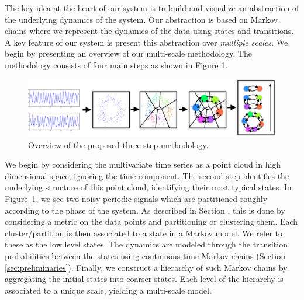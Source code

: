 The key idea at the heart of our system is to build and visualize an abstraction of the underlying 
dynamics of the system. Our abstraction is based on Markov chains where we represent the dynamics of the data using states and transitions. A key feature of our system is  present this abstraction over \emph{multiple scales}. 
%
%
We begin by presenting an overview
of our multi-scale methodology. The methodology consists of four main steps as shown in Figure \ref{fig:methodology}.
\begin{figure}[h!]
	\centering
	\includegraphics[width=\textwidth]{overall1-crop}
	\caption{Overview of the proposed three-step methodology.}
	\label{fig:methodology}
\end{figure}

We begin by considering the multivariate time series as a point cloud in high dimensional space, ignoring the time component. The second step identifies the underlying structure of this point cloud, identifying their most typical states. In Figure~\ref{fig:methodology}, we see two noisy periodic signals which are partitioned roughly according to the phase of the system. As described in Section , this is done by considering a metric on the data points and partitioning or clustering them. Each cluster/partition is then associated to a state in a Markov model. We refer to these as the low level states. The 
 dynamics are modeled through the transition probabilities between the states using continuous time Markov chains (Section \ref{sec:preliminaries}). Finally, we construct a hierarchy of such Markov chains by aggregating the initial states into coarser states. Each level of the hierarchy is associated to a unique scale, yielding a multi-scale model.

